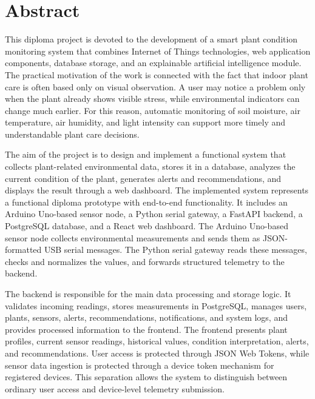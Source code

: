 \chapter*{Abstract}

This diploma project is devoted to the development of a smart plant condition monitoring system that combines Internet of Things technologies, web application components, database storage, and an explainable artificial intelligence module. The practical motivation of the work is connected with the fact that indoor plant care is often based only on visual observation. A user may notice a problem only when the plant already shows visible stress, while environmental indicators can change much earlier. For this reason, automatic monitoring of soil moisture, air temperature, air humidity, and light intensity can support more timely and understandable plant care decisions.

The aim of the project is to design and implement a functional system that collects plant-related environmental data, stores it in a database, analyzes the current condition of the plant, generates alerts and recommendations, and displays the result through a web dashboard. The implemented system represents a functional diploma prototype with end-to-end functionality. It includes an Arduino Uno-based sensor node, a Python serial gateway, a FastAPI backend, a PostgreSQL database, and a React web dashboard. The Arduino Uno-based sensor node collects environmental measurements and sends them as JSON-formatted USB serial messages. The Python serial gateway reads these messages, checks and normalizes the values, and forwards structured telemetry to the backend.

The backend is responsible for the main data processing and storage logic. It validates incoming readings, stores measurements in PostgreSQL, manages users, plants, sensors, alerts, recommendations, notifications, and system logs, and provides processed information to the frontend. The frontend presents plant profiles, current sensor readings, historical values, condition interpretation, alerts, and recommendations. User access is protected through JSON Web Tokens, while sensor data ingestion is protected through a device token mechanism for registered devices. This separation allows the system to distinguish between ordinary user access and device-level telemetry submission.

